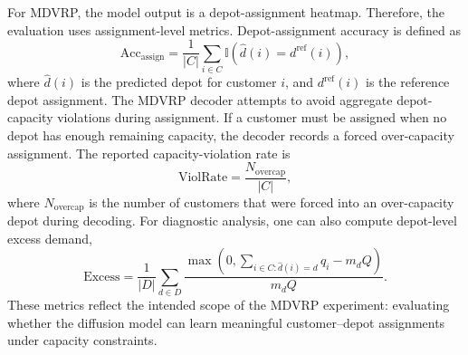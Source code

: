 For MDVRP, the model output is a depot-assignment heatmap. Therefore, the evaluation uses assignment-level metrics. Depot-assignment accuracy is defined as
\[
    \mathrm{Acc}_{\mathrm{assign}}
    =
    \frac{1}{|C|}
    \sum_{i \in C}
    \mathbb{I}
    \left(
        \hat{d}(i) = d^{\mathrm{ref}}(i)
    \right),
\]
where \(\hat{d}(i)\) is the predicted depot for customer \(i\), and \(d^{\mathrm{ref}}(i)\) is the reference depot assignment. The MDVRP decoder attempts to avoid aggregate depot-capacity violations during assignment. If a customer must be assigned when no depot has enough remaining capacity, the decoder records a forced over-capacity assignment. The reported capacity-violation rate is
\[
    \mathrm{ViolRate}
    =
    \frac{
        N_{\mathrm{overcap}}
    }{
        |C|
    },
\]
where \(N_{\mathrm{overcap}}\) is the number of customers that were forced into an over-capacity depot during decoding. For diagnostic analysis, one can also compute depot-level excess demand,
\[
    \mathrm{Excess}
    =
    \frac{1}{|D|}
    \sum_{d \in D}
    \frac{
        \max
        \left(
            0,
            \sum_{i \in C:\hat{d}(i)=d} q_i - m_d Q
        \right)
    }{
        m_d Q
    }.
\]
These metrics reflect the intended scope of the MDVRP experiment: evaluating whether the diffusion model can learn meaningful customer--depot assignments under capacity constraints.